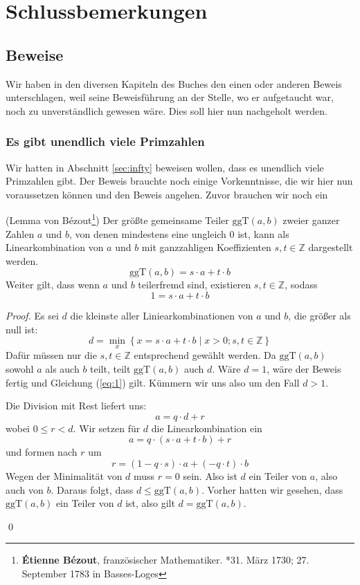 
\chapter{Schlussbemerkungen}

\section{Beweise}

Wir haben in den diversen Kapiteln des Buches den einen oder anderen Beweis unterschlagen, weil seine Beweisführung an der Stelle, wo er aufgetaucht war, noch zu unverständlich gewesen wäre. Dies soll hier nun nachgeholt werden.


\subsection{Es gibt unendlich viele Primzahlen}\label{chap:proofprime}
Wir hatten in Abschnitt \ref{sec:infty} beweisen wollen, dass es unendlich viele Primzahlen gibt. Der Beweis brauchte noch einige Vorkenntnisse, die wir hier nun voraussetzen können und den Beweis angehen. Zuvor brauchen wir noch ein

\begin{lemma}{(Lemma von Bézout\footnote{\textbf{Étienne Bézout}, französischer Mathematiker. *31. März 1730; 27. September 1783 in Basses-Loges})}
Der größte gemeinsame Teiler $\text{ggT}(a,b) $ zweier ganzer Zahlen $a$ und $b$, von denen mindestens eine ungleich 0 ist, kann als Linearkombination von $a$ und $b$ mit ganzzahligen Koeffizienten $s,t\in \mathbb{Z}$ dargestellt werden. 
\[
\text{ggT}(a,b) = s\cdot a+t\cdot b
\]
Weiter gilt, dass wenn $a$ und $b$ teilerfremd sind, existieren $s,t \in \mathbb{Z}$, sodass
\begin{equation}\label{eq:1}
1 = s\cdot a+t\cdot b
\end{equation}
\end{lemma}
\begin{proof}
Es sei $d$ die kleinste aller Liniearkombinationen von $a$ und $b$, die größer als null ist:
\[
d = \min_x \left\lbrace x = s\cdot a+t\cdot b \mid x>0; s,t\in \mathbb{Z} \right\rbrace
\]
Dafür müssen nur die $s,t\in \mathbb{Z}$ entsprechend gewählt werden. Da $\text{ggT}(a,b)$ sowohl $a$ als auch $b$ teilt, teilt $\text{ggT}(a,b)$ auch $d$. Wäre $d=1$, wäre der Beweis fertig und Gleichung (\ref{eq:1}) gilt. Kümmern wir uns also um den Fall $d>1$. 

Die Division mit Rest liefert uns:
\[
a = q\cdot d+r
\]
wobei $0\le r < d$. Wir setzen für $d$ die Linearkombination ein
\[
a = q\cdot(s\cdot a+t\cdot b)+r
\]
und formen nach $r$ um
\[
r = (1-q\cdot s)\cdot a+(-q\cdot t)\cdot b
\]
Wegen der Minimalität von $d$ muss $r=0$ sein. Also ist $d$ ein Teiler von $a$, also auch von $b$. Daraus folgt, dass $d\le \text{ggT}(a,b)$. Vorher hatten wir gesehen, dass $\text{ggT}(a,b)$ ein Teiler von $d$ ist, also gilt $d=\text{ggT}(a,b)$.

\qed
\end{proof}

